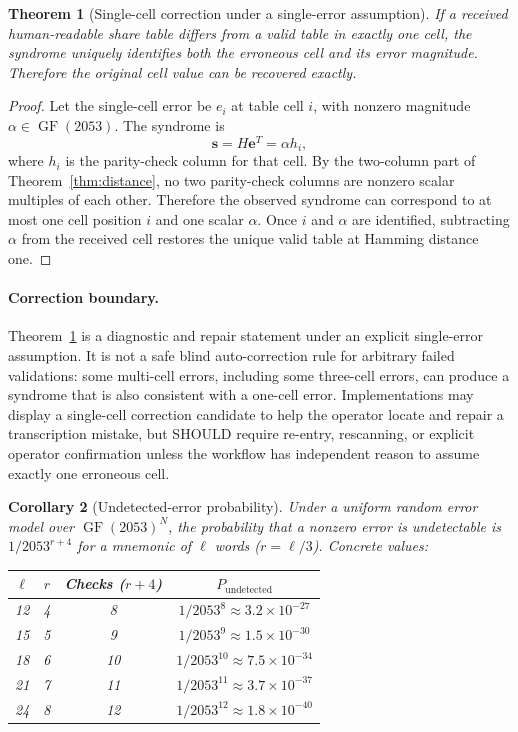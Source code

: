 \documentclass[11pt]{article}
\newcommand{\GF}{\operatorname{GF}}
\newtheorem{theorem}{Theorem}[subsection]
\newtheorem{corollary}[theorem]{Corollary}
\begin{document}
\begin{theorem}[Single-cell correction under a single-error assumption]
\label{thm:single-correction}
If a received human-readable share table differs from a valid table in exactly one cell, the syndrome uniquely identifies both the erroneous cell and its error magnitude. Therefore the original cell value can be recovered exactly.
\end{theorem}

\begin{proof}
Let the single-cell error be $e_i$ at table cell $i$, with nonzero magnitude $\alpha \in \GF(2053)$. The syndrome is
\[
    \mathbf{s} = H\mathbf{e}^{T} = \alpha h_i,
\]
where $h_i$ is the parity-check column for that cell. By the two-column part of Theorem~\ref{thm:distance}, no two parity-check columns are nonzero scalar multiples of each other. Therefore the observed syndrome can correspond to at most one cell position $i$ and one scalar $\alpha$. Once $i$ and $\alpha$ are identified, subtracting $\alpha$ from the received cell restores the unique valid table at Hamming distance one.
\end{proof}

\paragraph{Correction boundary.}
Theorem~\ref{thm:single-correction} is a diagnostic and repair statement under an explicit single-error assumption. It is not a safe blind auto-correction rule for arbitrary failed validations: some multi-cell errors, including some three-cell errors, can produce a syndrome that is also consistent with a one-cell error. Implementations may display a single-cell correction candidate to help the operator locate and repair a transcription mistake, but SHOULD require re-entry, rescanning, or explicit operator confirmation unless the workflow has independent reason to assume exactly one erroneous cell.

\begin{corollary}[Undetected-error probability]
\label{cor:prob}
Under a uniform random error model over $\GF(2053)^N$, the probability that a nonzero error is undetectable is $1/2053^{r+4}$ for a mnemonic of $\ell$ words ($r = \ell/3$). Concrete values:

\begin{center}
\small
\begin{tabular}{@{}cccc@{}}
\toprule
$\ell$ & $r$ & Checks ($r{+}4$) & $P_{\text{undetected}}$ \\ \midrule
12 & 4 & 8 & $1/2053^{8} \approx 3.2 \times 10^{-27}$ \\
15 & 5 & 9 & $1/2053^{9} \approx 1.5 \times 10^{-30}$ \\
18 & 6 & 10 & $1/2053^{10} \approx 7.5 \times 10^{-34}$ \\
21 & 7 & 11 & $1/2053^{11} \approx 3.7 \times 10^{-37}$ \\
24 & 8 & 12 & $1/2053^{12} \approx 1.8 \times 10^{-40}$ \\
\bottomrule
\end{tabular}
\end{center}
\end{corollary}
\end{document}
